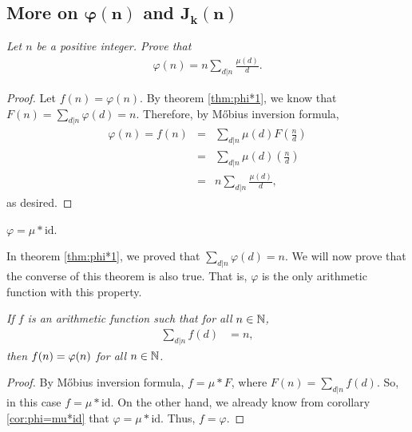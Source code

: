 \documentclass[12pt]{subfile}
\begin{document}
\subsection{More on \texorpdfstring{$\boldsymbol{\varphi(n)}$}{\textphi(n)} and \texorpdfstring{$\boldsymbol{J_k(n)}$}{Jk(n)}}\label{sec:euler-jordan}
		\begin{theorem} \slshape \label{thm:phi=n*sigma(mu/k)}
			Let $n$ be a positive integer. Prove that
			\begin{align*}
			\varphi(n)= n\sum_{d|n} \frac{\mu(d)}{d}.
			\end{align*}
		\end{theorem}
		
		\begin{proof}
			Let $f(n)=\varphi(n)$. By theorem \eqref{thm:phi*1}, we know that $F(n)=\sum\limits_{d|n} \varphi(d)=n$. Therefore, by M\H obius inversion formula,
				\begin{eqnarray*}
					\varphi(n) = f(n) &=& \sum_{d|n}\mu(d)F\left(\frac nd\right)\\
									  &=& \sum_{d|n}\mu(d)\left(\frac nd\right)\\
									  &=& n\sum_{d|n} \frac{\mu(d)}{d},
				\end{eqnarray*}
			as desired.
		\end{proof}
		
		
		\begin{corollary}\label{cor:phi=mu*id}
			$\varphi = \mu \ast \text{id}$.
		\end{corollary}

In theorem \eqref{thm:phi*1}, we proved that $\sum\limits_{d|n} \varphi(d)=n$. We will now prove that the converse of this theorem is also true. That is, $\varphi$ is the only arithmetic function with this property.

		\begin{theorem}\slshape \label{thm:sumofphicon}
			If $f$ is an arithmetic function such that for all $n\in\mathbb{N} $,
				\begin{align*}
					\sum_{d|n}f(d) & = n,
				\end{align*}
			then $f(n)=\varphi (n)$ for all $n\in\mathbb{N} $.
		\end{theorem}
		
		\begin{proof}
			By M\H obius inversion formula, $f = \mu \ast F$, where $F(n)=\sum\limits_{d|n}f(d)$. So, in this case $f=\mu \ast \text{id}$. On the other hand, we already know from corollary \eqref{cor:phi=mu*id} that $\varphi=\mu \ast \text{id}$. Thus, $f=\varphi$.
		\end{proof}
		
\end{document}
